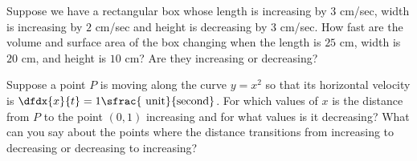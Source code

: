   \begin{embeddedproblem}{}
    Suppose we have a rectangular box whose length is increasing by
    $3$ cm/sec, width is increasing by $2$ cm/sec and height is
    decreasing by $3$ cm/sec.  How fast are the volume and surface
    area of the box changing when the length is $25$ cm, width is $20$
    cm, and height is $10$ cm?  Are they increasing or decreasing?
  \end{embeddedproblem}

\vskip-4mm{}

\begin{embeddedproblem}{}
  Suppose a point $P$ is moving along the curve $y=x^2$ so that its
  horizontal velocity is
  $\dfdx{x}{t}=1\sfrac{\text{ unit}}{\text{second}}$.  For which
  values of $x$ is the distance from $P$ to the point $(0,1)$
  increasing and for what values is it decreasing?  What can you say
  about the points where the distance transitions from increasing to
  decreasing or decreasing to increasing?
\end{embeddedproblem}



